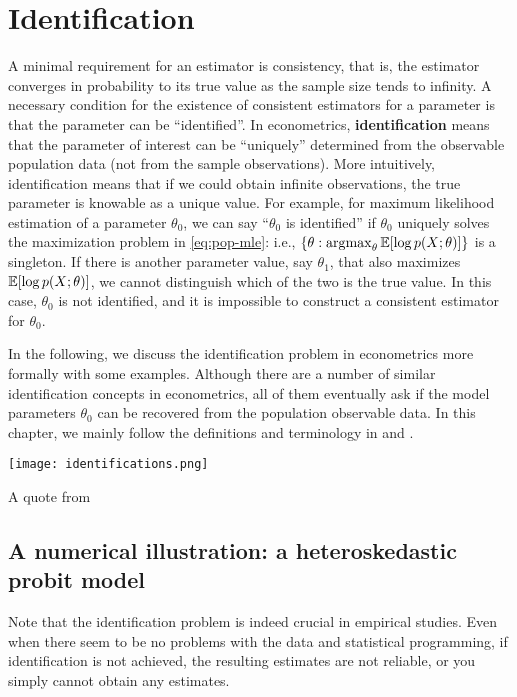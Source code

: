 \documentclass[11pt, A4paper, openany, uplatex]{book}
\begin{document}

\chapter{Identification}\label{chap:identification}

A minimal requirement for an estimator is consistency, that is, the estimator converges in probability to its true value as the sample size tends to infinity. 
A necessary condition for the existence of consistent estimators for a parameter is that the parameter can be ``identified''.
In econometrics, \textbf{identification} means that the parameter of interest can be ``uniquely'' determined from the observable population data (not from the sample observations).
More intuitively, identification means that if we could obtain infinite observations, the true parameter is knowable as a unique value.
For example, for maximum likelihood estimation of a parameter $\theta_0$, we can say ``$\theta_0$ is identified'' if $\theta_0$ uniquely solves the maximization problem in \eqref{eq:pop-mle}: i.e., $\{\theta : \operatorname*{\arg\!\max}_\theta \mathbb{E}[\log p(X; \theta)]\}$ is a singleton.
If there is another parameter value, say $\theta_1$, that also maximizes $\mathbb{E} [\log p(X; \theta)]$, we cannot distinguish which of the two is the true value.
In this case, $\theta_0$ is not identified, and it is impossible to construct a consistent estimator for $\theta_0$.

In the following, we discuss the identification problem in econometrics more formally with some examples.
Although there are a number of similar identification concepts in econometrics, all of them eventually ask if the model parameters $\theta_0$ can be recovered from the population observable data.
In this chapter, we mainly follow the definitions and terminology in \cite{hurwicz1950generalization} and \cite{matzkin2013nonparametric}.
\begin{screen}
\begin{center}
	\texttt{[image: identifications.png]}

	\footnotesize
	A quote from \cite{lewbel2019identification}
	\normalsize
\end{center}
\end{screen}

\section{A numerical illustration: a heteroskedastic probit model}
Note that the identification problem is indeed crucial in empirical studies.
Even when there seem to be no problems with the data and statistical programming, if identification is not achieved, the resulting estimates are not reliable, or you simply cannot obtain any estimates.
\end{document}
